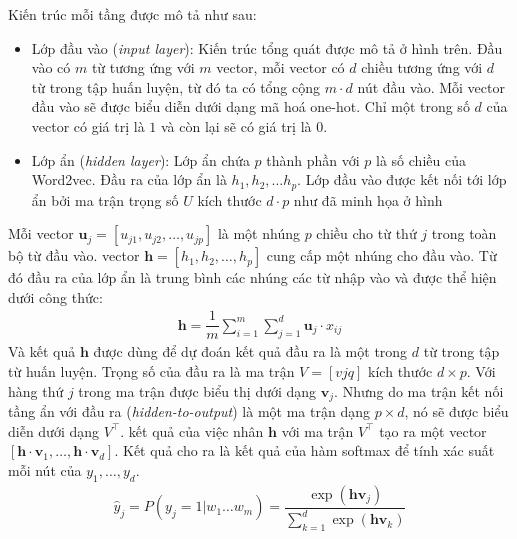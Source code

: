 Kiến trúc mỗi tầng được mô tả như sau: \cite{Aggarwal2022-xj}
\begin{itemize}
    \item Lớp đầu vào (\textit{input layer}): Kiến trúc tổng quát được mô tả ở hình trên. Đầu vào có $m$ từ tương ứng với $m$ vector, mỗi vector có $d$ chiều tương ứng với $d$ từ trong tập huấn luyện, từ đó ta có tổng cộng $m\cdot d$ nút đầu vào. Mỗi vector đầu vào sẽ được biểu diễn dưới dạng mã hoá one-hot. Chỉ một trong số $d$ của vector có giá trị là $1$ và còn lại sẽ có giá trị là $0$.
    \item Lớp ẩn (\textit{hidden layer}): Lớp ẩn chứa $p$ thành phần với $p$ là số chiều của Word2vec. Đầu ra của lớp ẩn là  $h_1,h_2,\dots h_p$. Lớp đầu vào được kết nối tới lớp ẩn bởi ma trận trọng số $U$ kích thước $d\cdot p$ như đã minh họa ở hình %
\end{itemize}

Mỗi vector $\mathbf u_j = [u_{j1}, u_{j2},\dots,u_{jp}]$ là một nhúng $p$ chiều cho từ thứ $j$ trong toàn bộ từ đầu vào. vector $\mathbf h = [h_1,h_2,\dots,h_p]$ cung cấp một nhúng cho đầu vào. Từ đó đầu ra của lớp ẩn là trung bình các nhúng các từ nhập vào và được thể hiện dưới công thức:
\begin{align}
    \mathbf h=\dfrac{1}{m}\sum_{i=1}^m\sum_{j=1}^d\mathbf u_j\cdot x_{ij}
\end{align}
Và kết quả $\mathbf h$ được dùng để dự đoán kết quả đầu ra là một trong $d$ từ trong tập từ huấn luyện. Trọng số của đầu ra là ma trận $V = [v{jq}]$ kích thước $d\times p$. Với hàng thứ $j$ trong ma trận được biểu thị dưới dạng $\mathbf v_j$. Nhưng do ma trận kết nối tầng ẩn với đầu ra (\textit{hidden-to-output}) là một ma trận dạng $p\times d$, nó sẽ được biểu diễn dưới dạng $V^\intercal$. kết quả của việc nhân $\mathbf h$ với ma trận $V^\intercal$ tạo ra một vector $[\mathbf h\cdot\mathbf v_1,\dots,\mathbf h\cdot \mathbf v_d]$. Kết quả cho ra là kết quả của hàm softmax để tính xác suất mỗi nút của $y_1,\dots,y_d$.
\begin{align}
    \hat y_j=P(y_j=1|w_1\dots w_m)=\dfrac{\exp(\mathbf h\mathbf v_j)}{\sum_{k=1}^d\exp(\mathbf h\mathbf v_k)}
\end{align}

